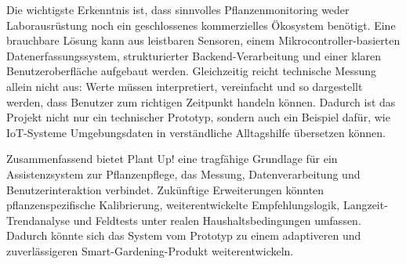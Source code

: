 Die wichtigste Erkenntnis ist, dass sinnvolles Pflanzenmonitoring weder Laborausr\"ustung noch ein geschlossenes kommerzielles \"Okosystem ben\"otigt. Eine brauchbare L\"osung kann aus leistbaren Sensoren, einem Mikrocontroller-basierten Datenerfassungssystem, strukturierter Backend-Verarbeitung und einer klaren Benutzeroberfl\"ache aufgebaut werden. Gleichzeitig reicht technische Messung allein nicht aus: Werte m\"ussen interpretiert, vereinfacht und so dargestellt werden, dass Benutzer zum richtigen Zeitpunkt handeln k\"onnen. Dadurch ist das Projekt nicht nur ein technischer Prototyp, sondern auch ein Beispiel daf\"ur, wie IoT-Systeme Umgebungsdaten in verst\"andliche Alltagshilfe \"ubersetzen k\"onnen.

Zusammenfassend bietet Plant Up! eine tragf\"ahige Grundlage f\"ur ein Assistenzsystem zur Pflanzenpflege, das Messung, Datenverarbeitung und Benutzerinteraktion verbindet. Zuk\"unftige Erweiterungen k\"onnten pflanzenspezifische Kalibrierung, weiterentwickelte Empfehlungslogik, Langzeit-Trendanalyse und Feldtests unter realen Haushaltsbedingungen umfassen. Dadurch k\"onnte sich das System vom Prototyp zu einem adaptiveren und zuverl\"assigeren Smart-Gardening-Produkt weiterentwickeln.

\fussy
{}
\clearpage
\null
\thispagestyle{empty}
\clearpage
